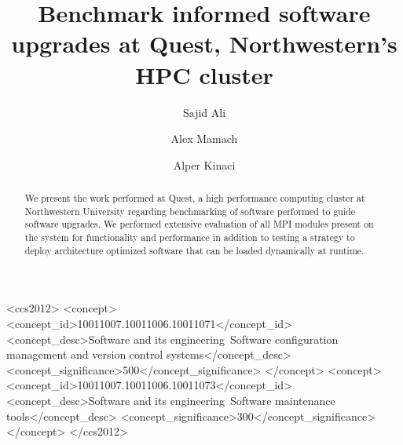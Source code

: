 \documentclass[manuscript,screen]{acmart}
\begin{document}
\title{Benchmark informed software upgrades at Quest, Northwestern's HPC cluster}

\author{Sajid Ali}

\author{Alex Mamach}


\author{Alper Kinaci}


\begin{abstract}
  We present the work performed at Quest, a high performance computing cluster at Northwestern University regarding benchmarking of software performed to guide software upgrades. We performed extensive evaluation of all MPI modules present on the system for functionality and performance in addition to testing a strategy to deploy architecture optimized software that can be loaded dynamically at runtime.
\end{abstract}

\begin{CCSXML}
	<ccs2012>
	<concept>
	<concept_id>10011007.10011006.10011071</concept_id>
	<concept_desc>Software and its engineering~Software configuration management and version control systems</concept_desc>
	<concept_significance>500</concept_significance>
	</concept>
	<concept>
	<concept_id>10011007.10011006.10011073</concept_id>
	<concept_desc>Software and its engineering~Software maintenance tools</concept_desc>
	<concept_significance>300</concept_significance>
	</concept>
	</ccs2012>
\end{CCSXML}
\end{document}
